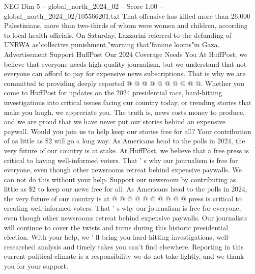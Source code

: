 \begin{textsample}{NEG Dim 5 – global\_north\_2024\_02 – Score 1.00 – global\_north\_2024\_02/105566201.txt}
That offensive has killed more than 26,000 Palestinians, more than two-thirds of whom were women and children, according to local health officials.
On Saturday, Lazzarini referred to the defunding of UNRWA as"collective punishment,"warning that"famine looms"in Gaza.
Advertisement Support HuffPost Our 2024 Coverage Needs You At HuffPost, we believe that everyone needs high-quality journalism, but we understand that not everyone can afford to pay for expensive news subscriptions.
That is why we are committed to providing deeply reported @ @ @ @ @ @ @ @ @ @.
Whether you come to HuffPost for updates on the 2024 presidential race, hard-hitting investigations into critical issues facing our country today, or trending stories that make you laugh, we appreciate you.
The truth is, news costs money to produce, and we are proud that we have never put our stories behind an expensive paywall.
Would you join us to help keep our stories free for all?
Your contribution of as little as \$2 will go a long way.
As Americans head to the polls in 2024, the very future of our country is at stake.
At HuffPost, we believe that a free press is critical to having well-informed voters.
That ' s why our journalism is free for everyone, even though other newsrooms retreat behind expensive paywalls.
We can not do this without your help.
Support our newsroom by contributing as little as \$2 to keep our news free for all.
As Americans head to the polls in 2024, the very future of our country is at @ @ @ @ @ @ @ @ @ @ press is critical to creating well-informed voters.
That ' s why our journalism is free for everyone, even though other newsrooms retreat behind expensive paywalls.
Our journalists will continue to cover the twists and turns during this historic presidential election.
With your help, we ' ll bring you hard-hitting investigations, well-researched analysis and timely takes you can't find elsewhere.
Reporting in this current political climate is a responsibility we do not take lightly, and we thank you for your support.

\end{textsample}
